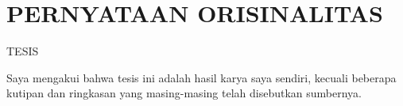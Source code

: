 
\chapter*{PERNYATAAN ORISINALITAS}

\begin{center}
  \textbf{\MakeUppercase{\thesisTitle}}\par
  \baselineskip
  TESIS\par
\end{center}

\baselineskip
\noindent Saya mengakui bahwa tesis ini adalah hasil karya saya sendiri, kecuali
beberapa kutipan dan ringkasan yang masing-masing telah disebutkan
sumbernya.

\baselineskip
\signOff{\thesisAuthor}{\thesisNim}
